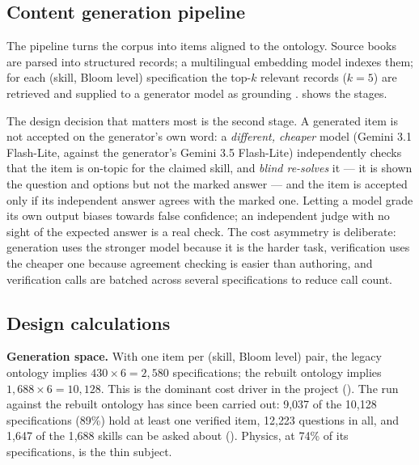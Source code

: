 

\subsection{Content generation pipeline}
\label{sec:generation-pipeline}

The pipeline turns the corpus into items aligned to the ontology. Source books
are parsed into structured records; a multilingual embedding model
\cite{reimers2019sentence} indexes them; for each (skill, Bloom level)
specification the top-$k$ relevant records ($k = 5$) are retrieved and supplied
to a generator model as grounding \cite{lewis2020retrieval}.
 shows the stages.



The design decision that matters most is the second stage. A generated item is
not accepted on the generator's own word: a \emph{different, cheaper} model
(Gemini 3.1 Flash-Lite, against the generator's Gemini 3.5 Flash-Lite)
independently checks that the item is on-topic for the claimed skill, and
\emph{blind re-solves} it --- it is shown the question and options but not the
marked answer --- and the item is accepted only if its independent answer agrees
with the marked one. Letting a model grade its own output biases towards false
confidence; an independent judge with no sight of the expected answer is a real
check. The cost asymmetry is deliberate: generation uses the stronger model
because it is the harder task, verification uses the cheaper one because
agreement checking is easier than authoring, and verification calls are batched
across several specifications to reduce call count.

\subsection{Design calculations}

\textbf{Generation space.} With one item per (skill, Bloom level) pair, the
legacy ontology implies $430 \times 6 = 2{,}580$ specifications; the rebuilt
ontology implies $1{,}688 \times 6 = 10{,}128$. This is the dominant cost driver
in the project (). The run against the rebuilt ontology has
since been carried out: 9{,}037 of the 10{,}128 specifications (89\%) hold at
least one verified item, 12{,}223 questions in all, and 1{,}647 of the 1{,}688
skills can be asked about (). Physics, at 74\% of its
specifications, is the thin subject.

